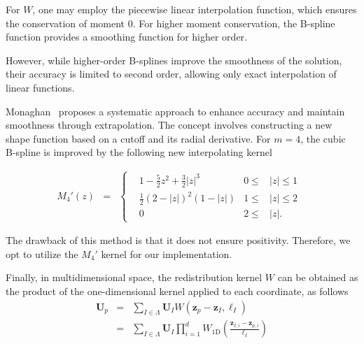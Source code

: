 For $W$, one may employ the piecewise linear interpolation function, which ensures the conservation of moment 0. For higher moment conservation, the B-spline function provides a smoothing function for higher order.

However, while higher-order B-splines improve the smoothness of the solution, their accuracy is limited to second order, allowing only exact interpolation of linear functions.

Monaghan~\cite{monaghan_extrapolating_1985} proposes a systematic approach to enhance accuracy and maintain smoothness through extrapolation. The concept involves constructing a new shape function based on a cutoff and its radial derivative. For $m = 4$, the cubic B-spline is improved by the following new interpolating kernel

\begin{eqnarray*}~\label{cubic_radial_kernel}
	M_4'(z) &=& \left\{ \begin{aligned}
		 & 1 - \frac{5}{2}z^2 + \frac{3}{2} |z|^3 & 0 \leq & |z| \leq  1 & \\
		 & \frac{1}{2}{(2 - |z|)}^2(1 - |z|)      & 1 \leq & |z| \leq 2  & \\
		 & 0                                      & 2 \leq & |z|.
	\end{aligned}
	\right.
\end{eqnarray*}

The drawback of this method is that it does not ensure positivity. Therefore, we opt to utilize the $M_4'$ kernel for our implementation.

Finally, in multidimensional space, the redistribution kernel $W$ can be obtained as the product of the one-dimensional kernel applied to each coordinate, as follows
\begin{eqnarray*}
	\bm U_p &=& \sum_{I \in \Lambda} \bm U_I  W \left(\bm z_p - \bm z_I, \ell_I \right) \\
	&=&  \sum_{I \in \Lambda} \bm U_I  \prod_{i = 1}^d W_{1\text{D}} \left(\frac{\bm z_{I, i} - \bm z_{p, i}}{\ell_I} \right)
\end{eqnarray*}